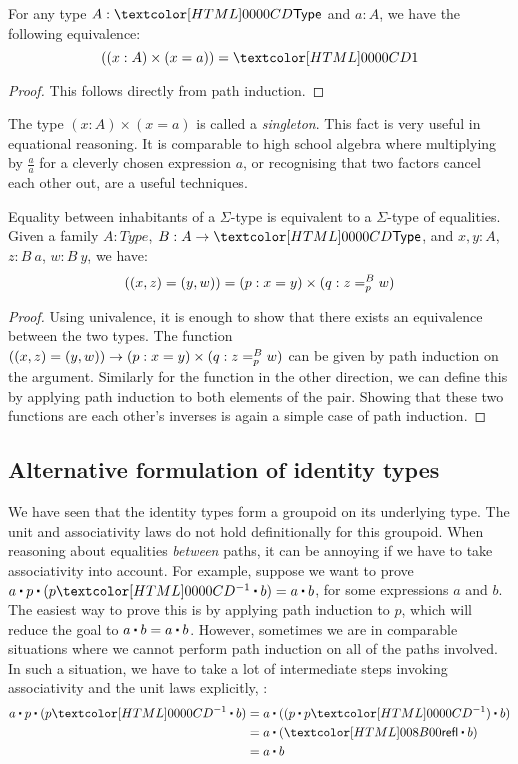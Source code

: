 \begin{proposition}
  For any type $A : \Type$ and $a : A$, we have the following
  equivalence:
  $$
  ((x : A) \times (x = a)) = \unitty
  $$
\end{proposition}

\begin{proof}
  This follows directly from path induction.
\end{proof}

The type $(x : A) \times (x = a)$ is called a \emph{singleton}. This
fact is very useful in equational reasoning. It is comparable to high
school algebra where multiplying by $\frac{a}{a}$ for a cleverly
chosen expression $a$, or recognising that two factors cancel
each other out, are a useful techniques.

\begin{proposition}
  Equality between inhabitants of a $\Sigma$-type is equivalent to a
  $\Sigma$-type of equalities. Given a family $A : Type$,
  $B : A \to \Type$, and $x , y : A$, $z : B\ a$, $w : B\ y$, we have:
  $$
  ((x , z) = (y , w)) = (p : x = y) \times (q : \pathover{B}{p}{z}{w})
  $$
\end{proposition}

\begin{proof}
  Using univalence, it is enough to show that there exists an
  equivalence between the two types. The function
  $((x , z) = (y , w)) \to (p : x = y) \times (q :
  \pathover{B}{p}{z}{w})$
  can be given by path induction on the argument. Similarly for the
  function in the other direction, we can define this by applying path
  induction to both elements of the pair. Showing that these two
  functions are each other's inverses is again a simple case of path
  induction.
\end{proof}

\subsection{Alternative formulation of identity types}
\label{alt-identity-type}
We have seen that the identity types form a groupoid on its underlying
type. The unit and associativity laws do not hold definitionally for
this groupoid. When reasoning about equalities \emph{between} paths,
it can be annoying if we have to take associativity into account. For
example, suppose we want to prove
$a \ct p \ct (\sym{p} \ct b) = a \ct b$, for some expressions $a$ and
$b$. The easiest way to prove this is by applying path induction to
$p$, which will reduce the goal to $a \ct b = a \ct b$. However,
sometimes we are in comparable situations where we cannot perform path
induction on all of the paths involved. In such a situation, we have
to take a lot of intermediate steps invoking associativity and the
unit laws explicitly, \eg:
%
\begin{align*}
  a \ct p \ct (\sym{p} \ct b) &= a \ct ((p \ct \sym{p}) \ct b) \\
                              &= a \ct (\refl \ct b) \\
                              &= a \ct b
\end{align*}

